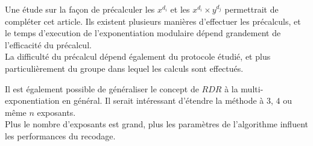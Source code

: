 \documentclass[12pt, a4paper]{memoir}
\begin{document}
Une étude sur la façon de précalculer les $x^{d_i}$ et les $x^{d_i} \times y^{d_j}$ permettrait de compléter
cet article. Ils existent plusieurs manières d'effectuer les précalculs, et le temps d'execution de 
l'exponentiation modulaire dépend grandement de l'efficacité du précalcul. \\
La difficulté du précalcul dépend également du protocole étudié, et plus particulièrement du groupe dans 
lequel les calculs sont effectués.

Il est également possible de généraliser le concept de $RDR$ à la multi-exponentiation en général. 
Il serait intéressant d'étendre la méthode à $3$, $4$ ou même $n$ exposants. \\
Plus le nombre d'exposants est grand, plus les paramètres de l'algorithme influent les performances du recodage.

\backmatter



%
\end{document}
